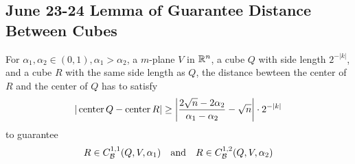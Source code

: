 \newpage
\subsection{June 23-24 Lemma of Guarantee Distance Between Cubes}

\begin{lemma}\label{lemma:Guarantee-Distance-containQ-Between-2alpha}
    For $\alpha_1, \alpha_2\in(0,1), \alpha_1>\alpha_2$, a $m$-plane $V$ in $\mathbb{R}^n$, a cube $Q$ with side length $2^{-|k|}$, and a cube $R$ with the same side length as $Q$, the distance bewteen the center of $R$ and the center of $Q$ has to satisfy
    \begin{equation*}
        |\operatorname{center} Q-\operatorname{center} R|\geq \left|\frac{2\sqrt{n} - 2\alpha_2}{\alpha_1-\alpha_2}-\sqrt{n}\right|\cdot 2^{-|k|}
    \end{equation*}
    to guarantee
    \begin{equation}\label{eq:condition-GDBC}
        R\in C_\mathcal B^{1,1}(Q, V, \alpha_1) \quad\text{and}\quad R\in  C_\mathcal B^{1,2}(Q, V, \alpha_2)
    \end{equation}
\end{lemma}
